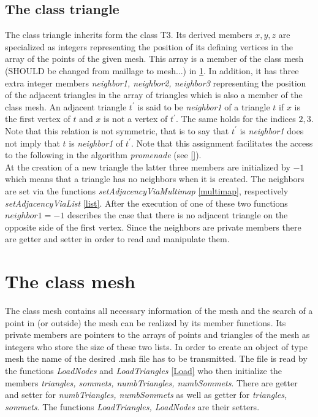 \documentclass[10pt]{article}
\begin{document}
\subsection{The class triangle} \label{triangle}
The class triangle inherits form the class T3. Its derived members $ x,y,z $ are specialized as integers representing the position of its defining vertices in the array of the points of the given mesh. This array is a member of the class mesh (SHOULD be changed from maillage to mesh...) in \ref{mesh}. In addition, it has three extra integer members {\itshape neighbor1, neighbor2, neighbor3} representing the position of the adjacent triangles in the array of triangles which is also a member of the class mesh. An adjacent triangle $ t^{'} $ is said to be  {\itshape neighbor1 } of a triangle $ t $ if $ x $ is the first vertex of $t$ and $x$ is not a vertex of $ t^{'} $. The same holds for the indices $ 2,3 $. Note that this relation is not symmetric, that is to say that $ t^{'} $ is {\itshape neighbor1} does not imply that $t$ is {\itshape neighbor1} of $t^{'}$. 
Note that this assignment facilitates the access to the following in the algorithm {\itshape promenade} (see \ref{}).  \\
At the creation of a new triangle the latter three members are initialized by $ -1 $ which means that a triangle has no neighbors when it is created. The neighbors are set via the functions {\itshape setAdjacencyViaMultimap} \ref{multimap}, respectively {\itshape setAdjacencyViaList} \ref{list}. After the execution of one of these two functions $neighbor1 =  -1 $ describes the case that there is no adjacent triangle on the opposite side of the first vertex. 
Since the neighbors are private members there are getter and setter in order to read and manipulate them. \\



\section{The class mesh} \label{mesh}
The class mesh contains all necessary information of the mesh and the search of a point in (or outside) the mesh can be realized by its member functions. Its private members are pointers to the arrays of points and triangles of the mesh as integers who store the size of these two lists.
In order to create an object of type mesh the name of the desired .msh file has to be transmitted. The file is read by the functions {\itshape LoadNodes} and {\itshape LoadTriangles} \ref{Load} who then initialize the members {\itshape triangles, sommets, numbTriangles, numbSommets}. 
There are getter and setter for {\itshape numbTriangles, numbSommets} as well as getter for {\itshape triangles, sommets}. The functions {\itshape LoadTriangles, LoadNodes} are their setters. 
\end{document}
